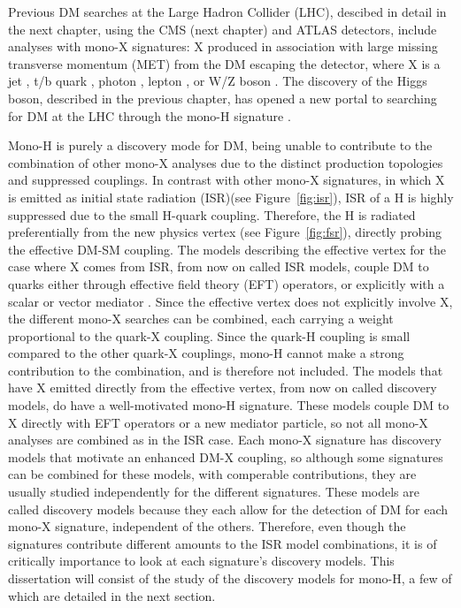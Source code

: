 Previous DM searches at the Large Hadron Collider (LHC), descibed in detail in the next chapter, using the CMS (next chapter) and ATLAS detectors, include analyses with mono-X signatures: X produced in association with large missing transverse momentum (MET) from the DM escaping the detector, where X is a jet \cite{Aad:2015zva, Khachatryan:2014rra}, t/b quark \cite{Aad:2014vea, Khachatryan:2014uma, Khachatryan:2015nua}, photon \cite{Aad:2014tda, Chatrchyan:2012tea, Khachatryan:2014rwa}, lepton \cite{Khachatryan:2014tva, ATLAS:2014wra}, or W/Z boson \cite{Aad:2014vka, Aad:2013oja, Khachatryan:2015bbl}. The discovery of the Higgs boson, described in the previous chapter, has opened a new portal to searching for DM at the LHC through the mono-H signature \cite{Carpenter:2013xra, Berlin:2014cfa}. 

\indent Mono-H is purely a discovery mode for DM, being unable to contribute to the combination of other mono-X analyses due to the distinct production topologies and suppressed couplings. In contrast with other mono-X signatures, in which X is emitted as initial state radiation (ISR)(see Figure~\ref{fig:isr}), ISR of a H is highly suppressed due to the small H-quark coupling. Therefore, the H is radiated preferentially from the new physics vertex (see Figure~\ref{fig:fsr}), directly probing the effective DM-SM coupling. The models describing the effective vertex for the case where X comes from ISR, from now on called ISR models, couple DM to quarks either through effective field theory (EFT) operators, or explicitly with a scalar or vector mediator \cite{Abercrombie:2015wmb}. Since the effective vertex does not explicitly involve X, the different mono-X searches can be combined, each carrying a weight proportional to the quark-X coupling. Since the quark-H coupling is small compared to the other quark-X couplings, mono-H cannot make a strong contribution to the combination, and is therefore not included. The models that have X emitted directly from the effective vertex, from now on called discovery models, do have a well-motivated mono-H signature. These models couple DM to X directly with EFT operators or a new mediator particle, so not all mono-X analyses are combined as in the ISR case. Each mono-X signature has discovery models that motivate an enhanced DM-X coupling, so although some signatures can be combined for these models, with comperable contributions, they are usually studied independently for the different signatures. These models are called discovery models because they each allow for the detection of DM for each mono-X signature, independent of the others. Therefore, even though the signatures contribute different amounts to the ISR model combinations, it is of critically importance to look at each signature's discovery models. This dissertation will consist of the study of the discovery models for mono-H, a few of which are detailed in the next section. 

